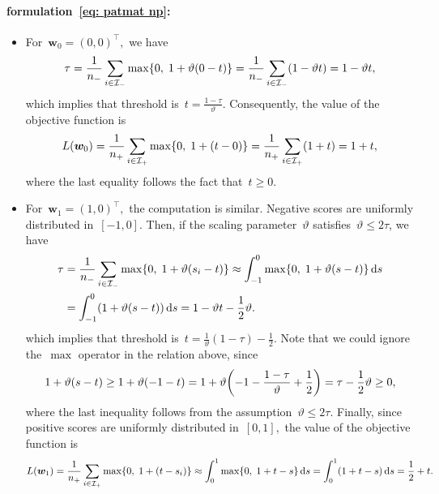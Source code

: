 \paragraph*{\PatMatNP formulation~\eqref{eq: patmat np}:}
\begin{itemize}
  \item For~$\bm{w}_0 = (0,0)^{\top},$ we have
  \begin{equation*}
    \tau
      = \frac{1}{\nneg}\sum_{i \in \Ineg}  \max\Brac[c]{0, \; 1 + \vartheta(0 - t)} 
      = \frac{1}{\nneg}\sum_{i \in \Ineg}  \Brac{1 - \vartheta t}
      = 1 - \vartheta t,
  \end{equation*}
  which implies that threshold is~$t = \frac{1-\tau}{\vartheta}.$ Consequently, the value of the objective function is
  \begin{equation*}
    L(\bm{w}_0)
      = \frac{1}{\npos} \sum_{i \in \Ipos} \max\Brac[c]{0, \; 1 + (t - 0)}
      = \frac{1}{\npos} \sum_{i \in \Ipos} \Brac{1 + t}
      = 1 + t,
  \end{equation*}
  where the last equality follows the fact that~$t \geq 0.$
  \item For~$\bm{w}_1 = (1,0)^{\top},$ the computation is similar. Negative scores are uniformly distributed in~$[-1,0].$ Then, if the scaling parameter~$\vartheta$ satisfies~$\vartheta \leq 2 \tau$, we have
  \begin{align*}
    \tau
      & = \frac{1}{\nneg}\sum_{i \in \Ineg}  \max\Brac[c]{0, \; 1 + \vartheta(s_i - t)}
      \approx \int_{-1}^{0} \max\Brac[c]{0, \; 1 + \vartheta(s - t)} \dd{s} \\
      & = \int_{-1}^{0} (1 + \vartheta(s - t)) \dd{s}
      = 1 - \vartheta t - \frac{1}{2} \vartheta.
  \end{align*}
  which implies that threshold is~$t = \frac{1}{\vartheta}(1-\tau) - \frac{1}{2}.$ Note that we could ignore the~$\max$ operator in the relation above, since 
  \begin{equation*}
    1 + \vartheta(s - t)
      \geq 1 + \vartheta(-1 - t)
      = 1 + \vartheta \Brac{- 1 - \frac{1 - \tau}{\vartheta} + \frac{1}{2}}
      = \tau - \frac{1}{2} \vartheta
      \geq 0,
  \end{equation*}
  where the last inequality follows from the assumption~$\vartheta \leq 2 \tau.$ Finally, since positive scores are uniformly distributed in~$[0,1],$ the value of the objective function is
  \begin{equation*}
    L(\bm{w}_1)
      = \frac{1}{\npos} \sum_{i \in \Ipos} \max\Brac[c]{0, \; 1 + (t - s_i)}
      \approx \int_{0}^{1} \max\Brac[c]{0, \; 1 + t - s} \dd{s}
      = \int_{0}^{1} (1 + t - s)\dd{s}
      = \frac{1}{2} + t.
  \end{equation*}
\end{itemize}

